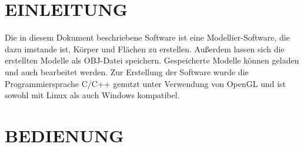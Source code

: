 \newpage
\section{\Large EINLEITUNG}
Die in diesem Dokument beschriebene Software ist eine Modellier-Software, die dazu imstande ist, Körper und Flächen zu erstellen. Außerdem lassen sich die erstellten Modelle als OBJ-Datei speichern. Gespeicherte Modelle können geladen und auch bearbeitet werden.\newline
Zur Erstellung der Software wurde die Programmiersprache C/C++ genutzt unter Verwendung von OpenGL und ist sowohl mit Linux als auch Windows kompatibel.

\section{\Large BEDIENUNG}
